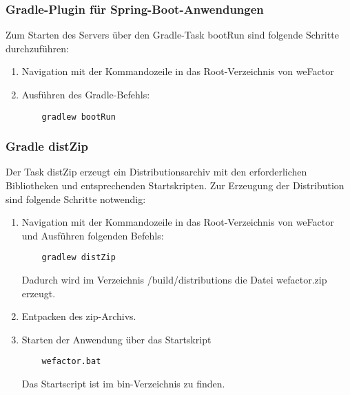 \subsubsection{Gradle-Plugin für Spring-Boot-Anwendungen}
Zum Starten des Servers über den Gradle-Task bootRun sind folgende Schritte durchzuführen:
   \begin{enumerate}

    \item Navigation mit der Kommandozeile in das Root-Verzeichnis von weFactor
    \item Ausführen des Gradle-Befehls:
    \begin{lstlisting}
    gradlew bootRun
    \end{lstlisting}

   \end{enumerate}

\subsubsection{Gradle distZip}
Der Task distZip erzeugt ein Distributionsarchiv mit den erforderlichen Bibliotheken und entsprechenden Startskripten. Zur Erzeugung der Distribution sind folgende Schritte notwendig:

   \begin{enumerate}

    \item Navigation mit der Kommandozeile in das Root-Verzeichnis von weFactor und Ausführen folgenden Befehls:
    \begin{lstlisting}
    gradlew distZip
    \end{lstlisting}
    Dadurch wird im Verzeichnis /build/distributions die Datei wefactor.zip erzeugt.
    \item Entpacken des zip-Archivs.
    \item Starten der Anwendung über das Startskript
    \begin{lstlisting}
    wefactor.bat
    \end{lstlisting}
    Das Startscript ist im bin-Verzeichnis zu finden.
        

   \end{enumerate}



